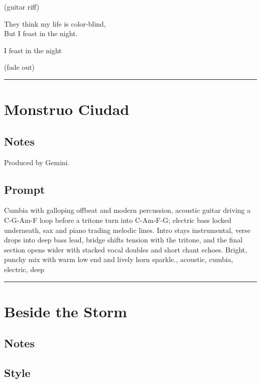 (guitar riff)

They think my life is color-blind,\\
But I feast in the night.

I feast in the night

(fade out)

\begin{center}\rule{0.5\linewidth}{0.5pt}\end{center}

\section{Monstruo Ciudad}\label{monstruo-ciudad}

\subsection{Notes}\label{notes-2}

Produced by Gemini.

\subsection{Prompt}\label{prompt}

Cumbia with galloping offbeat and modern percussion, acoustic guitar
driving a C-G-Am-F loop before a tritone turn into C-Am-F-G; electric
bass locked underneath, sax and piano trading melodic lines. Intro stays
instrumental, verse drops into deep bass lead, bridge shifts tension
with the tritone, and the final section opens wider with stacked vocal
doubles and short chant echoes. Bright, punchy mix with warm low end and
lively horn sparkle., acoustic, cumbia, electric, deep

\begin{center}\rule{0.5\linewidth}{0.5pt}\end{center}

\section{Beside the Storm}\label{beside-the-storm}

\subsection{Notes}\label{notes-3}

\subsection{Style}\label{style-2}

